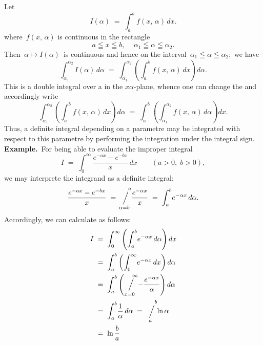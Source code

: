 \documentclass[12pt]{article}
\newcommand{\sijoitus}[2]%
{\operatornamewithlimits{\Big/}_{\!\!\!#1}^{\,#2}}
\begin{document}
Let
$$I(\alpha) \;=\; \int_a^b\!f(x,\,\alpha)\,dx.$$
where \,$f(x,\,\alpha)$ is continuous in the rectangle
$$a \leqq x \leqq b,\, \quad \alpha_1 \leqq \alpha \leqq \alpha_2.$$
Then\, $\alpha \mapsto I(\alpha)$\, is continuous and hence  on the interval 
\,$\alpha_1 \leqq \alpha \leqq \alpha_2$;\, we have
$$\int_{\alpha_1}^{\alpha_2}I(\alpha)\,d\alpha \;=\; \int_{\alpha_1}^{\alpha_2}\left(\int_a^b\!f(x,\,\alpha)\,dx\right)d\alpha.$$
This is a double integral over a  in the $x\alpha$-plane, whence one can change the  and accordingly write 
$$\int_{\alpha_1}^{\alpha_2}\left(\int_a^b\!f(x,\,\alpha)\,dx\right)d\alpha 
\;=\; \int_a^b\left(\int_{\alpha_1}^{\alpha_2}\!f(x,\,\alpha)\,d\alpha\right)dx.$$
Thus, a definite integral depending on a parametre may be integrated  with respect to this parametre by performing the integration under the integral sign.\\


\textbf{Example.}\, For being able to evaluate the improper integral
$$I \;=\; \int_0^\infty\frac{e^{-ax}-e^{-bx}}{x}\,dx \qquad (a > 0,\; b > 0),$$
we may interprete the integrand as a definite integral:
$$\frac{e^{-ax}-e^{-bx}}{x} \;=\; \sijoitus{\alpha=b}{\quad a}\!\frac{e^{-\alpha x}}{x} 
\;=\; \int_a^b\!e^{-\alpha x}\,d\alpha.$$
Accordingly, we can calculate as follows:
\begin{align*}
I & \;=\; \int_0^\infty\left(\int_a^b\!e^{-\alpha x}\,d\alpha\right)dx\\
& \;=\; \int_a^b\left(\int_0^\infty\!e^{-\alpha x}\,dx\right)d\alpha\\
& \;=\; \int_a^b\left(\sijoitus{x=0}{\quad\infty}\!-\frac{e^{-\alpha x}}{\alpha}\right)d\alpha\\
& \;=\; \int_a^b\!\frac{1}{\alpha}\,d\alpha \;=\; \sijoitus{a}{\quad b}\!\ln{\alpha}\\ 
& \;=\; \ln\frac{b}{a}
\end{align*}


\end{document}
